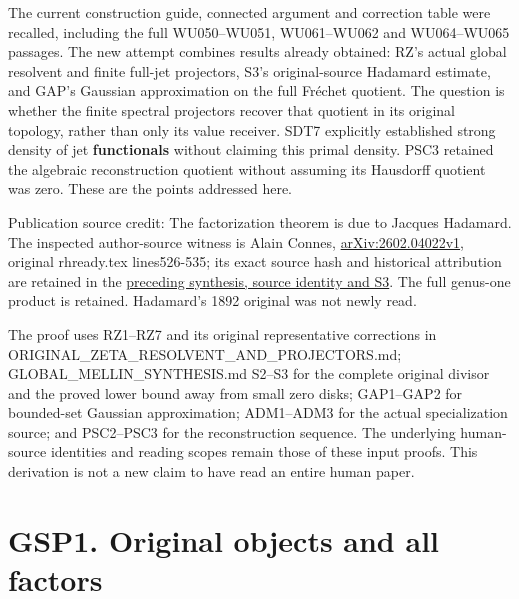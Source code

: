 The current construction guide, connected argument and correction table
were recalled, including the full WU050--WU051, WU061--WU062 and
WU064--WU065 passages. The new attempt combines results already
obtained: RZ's actual global resolvent and finite full-jet projectors,
S3's original-source Hadamard estimate, and GAP's Gaussian approximation
on the full Fréchet quotient. The question is whether the finite
spectral projectors recover that quotient in its original topology,
rather than only its value receiver. SDT7 explicitly established strong
density of jet \textbf{functionals} without claiming this primal
density. PSC3 retained the algebraic reconstruction quotient without
assuming its Hausdorff quotient was zero. These are the points addressed
here.

Publication source credit: The factorization theorem is due to Jacques
Hadamard. The inspected author-source witness is Alain Connes,
\href{https://arxiv.org/abs/2602.04022v1}{arXiv:2602.04022v1}, original
rhready.tex lines526-535; its exact source hash and historical
attribution are retained in the
\href{https://github.com/KokunoYumeto/zeta-function-research-reader/blob/36a82ecca98addb8a98b48204e349737856c7223/workbenches/splitzero-tandem/continuations/20260924-cohomology-weight-and-character-lifts/gct-weight-control/proofs/GLOBAL_MELLIN_SYNTHESIS.md}{preceding
synthesis, source identity and S3}. The full genus-one product is
retained. Hadamard's 1892 original was not newly read.

The proof uses RZ1--RZ7 and its original representative corrections in
ORIGINAL\_ZETA\_RESOLVENT\_AND\_PROJECTORS.md;
GLOBAL\_MELLIN\_SYNTHESIS.md S2--S3 for the complete original divisor
and the proved lower bound away from small zero disks; GAP1--GAP2 for
bounded-set Gaussian approximation; ADM1--ADM3 for the actual
specialization source; and PSC2--PSC3 for the reconstruction sequence.
The underlying human-source identities and reading scopes remain those
of these input proofs. This derivation is not a new claim to have read
an entire human paper.

\section{GSP1. Original objects and all
factors}\label{gsp1.-original-objects-and-all-factors}

